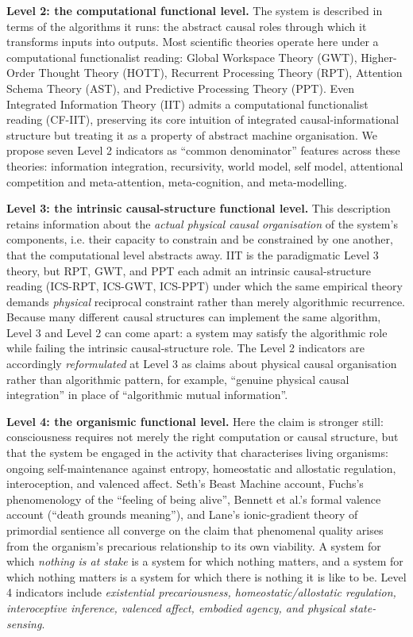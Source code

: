 \documentclass[11pt, a4paper, onecolumn, gdm]{google}
\begin{document}
\textbf{Level 2: the computational functional level.} The system is described in terms of the algorithms it runs: the abstract causal roles through which it transforms inputs into outputs.
Most scientific theories operate here under a computational functionalist reading: Global Workspace Theory (GWT), Higher-Order Thought Theory (HOTT), Recurrent Processing Theory (RPT), Attention Schema Theory (AST), and Predictive Processing Theory (PPT).
Even Integrated Information Theory (IIT) admits a computational functionalist reading (CF-IIT), preserving its core intuition of integrated causal-informational structure but treating it as a property of abstract machine organisation.
We propose seven Level 2 indicators as ``common denominator'' features across these theories: information integration, recursivity, world model, self model, attentional competition and meta-attention, meta-cognition, and meta-modelling.

\textbf{Level 3: the intrinsic causal-structure functional level.} This description retains information about the \emph{actual physical causal organisation} of the system's components, i.e. their capacity to constrain and be constrained by one another, that the computational level abstracts away.
IIT is the paradigmatic Level 3 theory, but RPT, GWT, and PPT each admit an intrinsic causal-structure reading (ICS-RPT, ICS-GWT, ICS-PPT) under which the same empirical theory demands \emph{physical} reciprocal constraint rather than merely algorithmic recurrence.
Because many different causal structures can implement the same algorithm, Level 3 and Level 2 can come apart: a system may satisfy the algorithmic role while failing the intrinsic causal-structure role.
The Level 2 indicators are accordingly \emph{reformulated} at Level 3 as claims about physical causal organisation rather than algorithmic pattern, for example, ``genuine physical causal integration'' in place of ``algorithmic mutual information''.

\textbf{Level 4: the organismic functional level.} Here the claim is stronger still: consciousness requires not merely the right computation or causal structure, but that the system be engaged in the activity that characterises living organisms: ongoing self-maintenance against entropy, homeostatic and allostatic regulation, interoception, and valenced affect.
Seth's Beast Machine account, Fuchs's phenomenology of the ``feeling of being alive'', Bennett et al.'s formal valence account (``death grounds meaning''), and Lane's ionic-gradient theory of primordial sentience all converge on the claim that phenomenal quality arises from the organism's precarious relationship to its own viability.
A system for which \emph{nothing is at stake} is a system for which nothing matters, and a system for which nothing matters is a system for which there is nothing it is like to be.
Level 4 indicators include \emph{existential precariousness, homeostatic/allostatic regulation, interoceptive inference, valenced affect, embodied agency, and physical state-sensing}.
\end{document}
